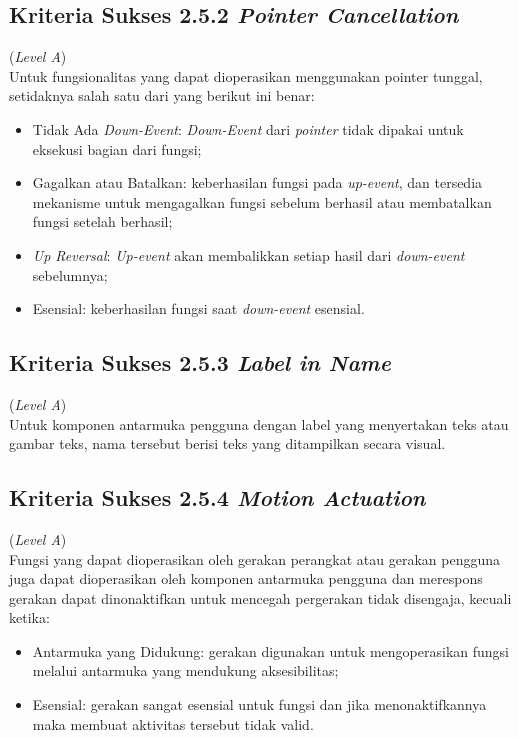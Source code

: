 \subsection{Kriteria Sukses 2.5.2 \textit{Pointer Cancellation}}
\label{subsec:kriteria_2.5.2}
(\textit{Level A}) \\

Untuk fungsionalitas yang dapat dioperasikan menggunakan pointer tunggal, setidaknya salah satu dari yang berikut ini benar:

\begin{itemize}
	\item Tidak Ada \textit{Down-Event}: \textit{Down-Event} dari \textit{pointer} tidak dipakai untuk eksekusi bagian dari fungsi;
	\item Gagalkan atau Batalkan: keberhasilan fungsi pada \textit{up-event}, dan tersedia mekanisme untuk mengagalkan fungsi sebelum berhasil atau membatalkan fungsi setelah berhasil;
	\item \textit{Up Reversal}: \textit{Up-event} akan membalikkan setiap hasil dari \textit{down-event} sebelumnya;
	\item Esensial: keberhasilan fungsi saat \textit{down-event} esensial.
\end{itemize}

\subsection{Kriteria Sukses 2.5.3 \textit{Label in Name}}
\label{subsec:kriteria_2.5.3}
(\textit{Level A}) \\

Untuk komponen antarmuka pengguna dengan label yang menyertakan teks atau gambar teks, nama tersebut berisi teks yang ditampilkan secara visual.

\subsection{Kriteria Sukses 2.5.4 \textit{Motion Actuation}}
\label{subsec:kriteria_2.5.4}
(\textit{Level A}) \\

Fungsi yang dapat dioperasikan oleh gerakan perangkat atau gerakan pengguna juga dapat dioperasikan oleh komponen antarmuka pengguna dan merespons gerakan dapat dinonaktifkan untuk mencegah pergerakan tidak disengaja, kecuali ketika:

\begin{itemize}
	\item Antarmuka yang Didukung: gerakan digunakan untuk mengoperasikan fungsi melalui antarmuka yang mendukung aksesibilitas;
	\item Esensial: gerakan sangat esensial untuk fungsi dan jika menonaktifkannya maka membuat aktivitas tersebut tidak valid.
\end{itemize}

